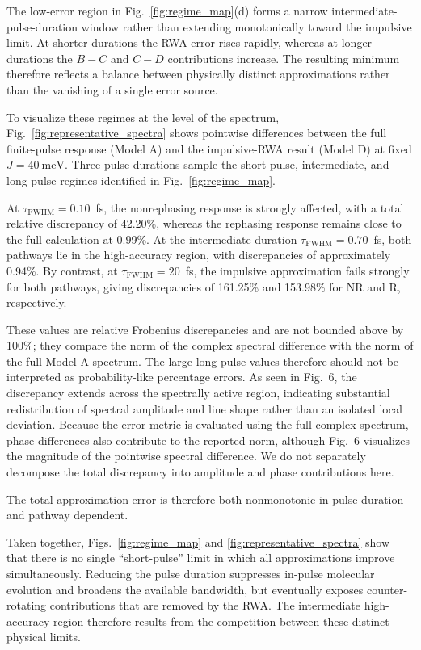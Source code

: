 The low-error region in Fig.~\ref{fig:regime_map}(d) forms a narrow
intermediate-pulse-duration window rather than extending monotonically
toward the impulsive limit.
At shorter durations the RWA error rises rapidly, whereas at longer
durations the $B-C$ and $C-D$ contributions increase.
The resulting minimum therefore reflects a balance between physically
distinct approximations rather than the vanishing of a single error
source.

To visualize these regimes at the level of the spectrum,
Fig.~\ref{fig:representative_spectra} shows pointwise differences
between the full finite-pulse response (Model A) and the
impulsive-RWA result (Model D) at fixed
$J=40~\mathrm{meV}$.
Three pulse durations sample the short-pulse, intermediate, and
long-pulse regimes identified in Fig.~\ref{fig:regime_map}.

At $\tau_{\mathrm{FWHM}}=0.10$~fs, the nonrephasing response is
strongly affected, with a total relative discrepancy of 42.20\%,
whereas the rephasing response remains close to the full calculation
at 0.99\%. At the intermediate duration
$\tau_{\mathrm{FWHM}}=0.70$~fs, both pathways lie in the
high-accuracy region, with discrepancies of approximately 0.94\%.
By contrast, at $\tau_{\mathrm{FWHM}}=20$~fs, the impulsive
approximation fails strongly for both pathways, giving discrepancies
of 161.25\% and 153.98\% for NR and R, respectively.

These values are relative Frobenius discrepancies and are not bounded
above by 100\%; they compare the norm of the complex spectral
difference with the norm of the full Model-A spectrum. The large
long-pulse values therefore should not be interpreted as
probability-like percentage errors. As seen in Fig.~6, the discrepancy
extends across the spectrally active region, indicating substantial
redistribution of spectral amplitude and line shape rather than an
isolated local deviation. Because the error metric is evaluated using
the full complex spectrum, phase differences also contribute to the
reported norm, although Fig.~6 visualizes the magnitude of the
pointwise spectral difference. We do not separately decompose the
total discrepancy into amplitude and phase contributions here.

The total approximation error is therefore both nonmonotonic in pulse
duration and pathway dependent.

Taken together, Figs.~\ref{fig:regime_map} and
\ref{fig:representative_spectra} show that there is no single
``short-pulse'' limit in which all approximations improve
simultaneously.
Reducing the pulse duration suppresses in-pulse molecular evolution
and broadens the available bandwidth, but eventually exposes
counter-rotating contributions that are removed by the RWA.
The intermediate high-accuracy region therefore results from the
competition between these distinct physical limits.
